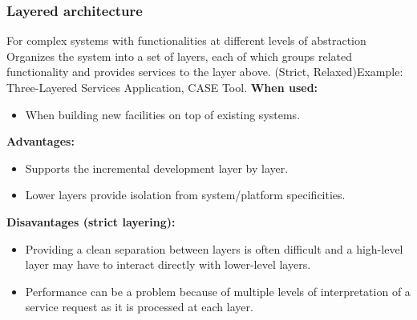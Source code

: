 \documentclass[../ESOF_notes.tex]{subfiles}
\begin{document}
\subsubsection{Layered architecture}  For complex systems with functionalities at different levels of abstraction\newline\newline
Organizes the system into a set of layers, each of which groups related functionality and provides services to the layer above. (Strict, Relaxed)\newline Example: Three-Layered Services Application, CASE Tool. \newline\newline
\textbf{When used:}
\begin{itemize}
    \item When building new facilities on top of existing systems.
\end{itemize}
\textbf{Advantages:}
\begin{itemize}
    \item Supports the incremental development layer by layer.
    \item Lower layers provide isolation from system/platform specificities.
\end{itemize}
\textbf{Disavantages (strict layering):}
\begin{itemize}
    \item Providing a clean separation between layers is often difficult and a high-level layer may have to interact directly with lower-level layers.
    \item Performance can be a problem because of multiple levels of interpretation of a service request as it is processed at each layer.
\end{itemize}
\end{document}
